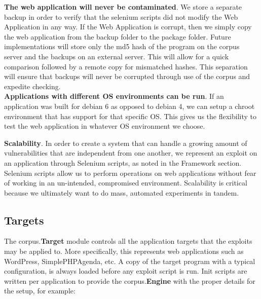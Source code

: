 \documentclass[letterpaper,twocolumn,10pt]{article}
\begin{document}
{\bf The web application will never be contaminated}.  We store a separate backup in order to verify that the selenium scripts did not modify the Web Application in any way.  If the Web Application is corrupt, then we simply copy the web application from the backup folder to the package folder.  Future implementations will store only the md5 hash of the program on the corpus server and the backups on an external server.  This will allow for a quick comparison followed by a remote copy for mismatched hashes.  This separation will ensure that backups will never be corrupted through use of the corpus and expedite checking.  \\

{\bf Applications with different OS environments can be run}.  If an application was built for debian 6 as opposed to debian 4, we can setup a chroot environment that has support for that specific OS.  This gives us the flexibility to test the web application in whatever OS environment we choose.

{\bf Scalability}.  In order to create a system that can handle a growing amount of vulnerabilities that are independent from one another, we represent an exploit on an application through  Selenium scripts, as noted in the Framework section.  Selenium scripts allow us to perform operations on web applications without fear of working in an un-intended, compromised environment.  Scalability is critical because we ultimately want to do mass, automated experiments in tandem. \\




\subsection{Targets}

   The corpus.{\bf Target} module controls all the application targets that the exploits may be applied to.  More specifically, this represents web applications such as WordPress, SimplePHPAgenda, etc. A copy of the target program with a typical configuration, is always loaded before any exploit script is run.  Init scripts are written per application to provide the corpus.{\bf Engine} with the proper details for the setup, for example:
\end{document}
